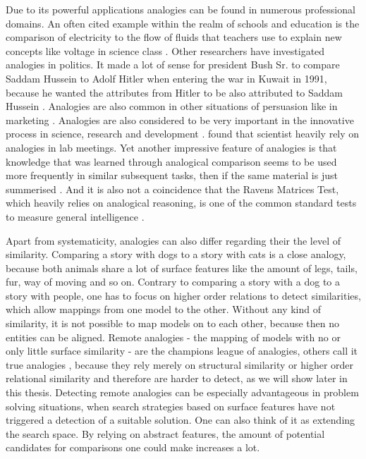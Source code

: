 \documentclass[a4paper,man,natbib,floatsintext,import]{apa6}
\begin{document}
Due to its powerful applications analogies can be found in numerous professional domains. An often cited example within the realm of schools and education is the comparison of electricity to the flow of fluids that teachers use to explain new concepts like voltage in science class \citep{Treagust1992,Dupin1989,Gentner1982}. Other researchers have investigated analogies in politics. It made a lot of sense for president Bush Sr. to compare Saddam Hussein to Adolf Hitler when entering the war in Kuwait in 1991, because he wanted the attributes from Hitler to be also attributed to Saddam Hussein \citep{MacDonald2002}. Analogies are also common in other situations of persuasion like in marketing \citep{Herzenstein2014,Cornelissen2003}. Analogies are also considered to be very important in the innovative process in science, research and development \citep{Gentner2002}. \cite{Dunbar2001} found that scientist heavily rely on analogies in lab meetings. Yet another impressive feature of analogies is that knowledge that was learned through analogical comparison seems to be used more frequently in similar subsequent tasks, then if the same material is just summerised \citep{Gentner2003a,Loewenstein1999}. And it is also not a coincidence that the Ravens Matrices Test, which heavily relies on analogical reasoning, is one of the common standard tests to measure general intelligence \citep{Carpenter1990}.

Apart from systematicity, analogies can also differ regarding their the level of similarity. Comparing a story with dogs to a story with cats is a close analogy, because both animals share a lot of surface features like the amount of legs, tails, fur, way of moving and so on. Contrary to comparing a story with a dog to a story with people, one has to focus on higher order relations to detect similarities, which allow mappings from one model to the other. Without any kind of similarity, it is not possible to map models on to each other, because then no entities can be aligned. Remote analogies - the mapping of models with no or only little surface similarity - are the champions league of analogies, others call it true analogies \citep{Wharton1996}, because they rely merely on structural similarity or higher order relational similarity \citep{Catrambone2002} and therefore are harder to detect, as we will show later in this thesis. Detecting remote analogies can be especially advantageous in problem solving situations, when search strategies based on surface features have not triggered a detection of a suitable solution. One can also think of it as extending the search space. By relying on abstract features, the amount of potential candidates for comparisons one could make increases a lot.
\end{document}
